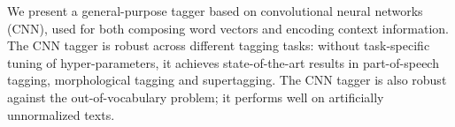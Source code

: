 We present a general-purpose tagger based on convolutional neural networks (CNN), used for both composing word vectors and encoding context information. The CNN tagger is robust across different tagging tasks: without task-specific tuning of hyper-parameters, it achieves state-of-the-art results in part-of-speech tagging, morphological tagging and supertagging. The CNN tagger is also robust against the out-of-vocabulary problem; it performs well on artificially unnormalized texts.
